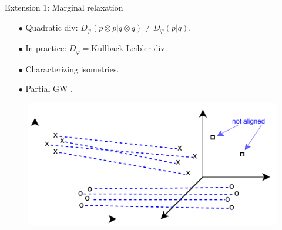\documentclass{beamer}
\begin{document}
\begin{frame}{Extension 1: Marginal relaxation}
  \begin{minipage}[t]{0.6\linewidth}
  \begin{itemize}
    \item[$\bullet$] Quadratic div: $D_{\varphi}(p \otimes p | q \otimes q) \neq D_{\varphi}(p | q)$.
    \item[$\bullet$] In practice: $D_{\varphi} = \text{Kullback-Leibler div}$.
    \item[$\bullet$] Characterizing isometries.
    \item[$\bullet$] Partial GW \parencite{Chapel20}.
  \end{itemize}
  \end{minipage}%
  \hfill%
  \hspace{-6cm}
  \begin{minipage}[t]{0.45\linewidth}
    \vspace{0.2cm}
  \begin{figure}
    \centering
    \includegraphics[width=1.15\linewidth, keepaspectratio=true]{OT_new/ugw.pdf}
  \end{figure}
  \end{minipage}

\end{frame}
\end{document}
